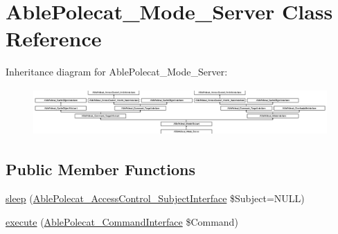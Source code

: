\hypertarget{class_able_polecat___mode___server}{}\section{Able\+Polecat\+\_\+\+Mode\+\_\+\+Server Class Reference}
\label{class_able_polecat___mode___server}
Inheritance diagram for Able\+Polecat\+\_\+\+Mode\+\_\+\+Server\+:\begin{figure}[H]
\begin{center}
\leavevmode
\includegraphics[height=1.806452cm]{class_able_polecat___mode___server}
\end{center}
\end{figure}
\subsection*{Public Member Functions}
\begin{DoxyCompactItemize}
\item 
\hyperlink{class_able_polecat___mode___server_a365e24d7b066205cafa2a5cce3a4f224}{sleep} (\hyperlink{interface_able_polecat___access_control___subject_interface}{Able\+Polecat\+\_\+\+Access\+Control\+\_\+\+Subject\+Interface} \$Subject=N\+U\+L\+L)
\item 
\hyperlink{class_able_polecat___mode___server_aa7f01cbd17bffdbbb7511a3c37756064}{execute} (\hyperlink{interface_able_polecat___command_interface}{Able\+Polecat\+\_\+\+Command\+Interface} \$Command)
\end{DoxyCompactItemize}
